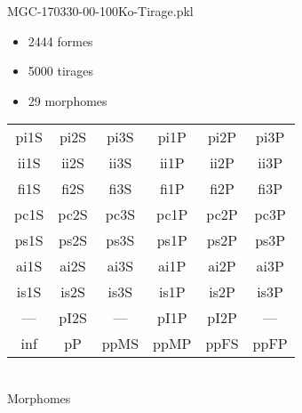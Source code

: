 MGC-170330-00-100Ko-Tirage.pkl
\begin{itemize}
\item 2444 formes
\item 5000 tirages
\item 29 morphomes
\end{itemize}
\begin{center}
\begin{tabular}{cccccc}
\hline
\cellcolor{white}pi1S & \cellcolor{orange}pi2S & \cellcolor{orange}pi3S & \cellcolor{blue}pi1P & \cellcolor{white}pi2P & \cellcolor{white}pi3P\\
\cellcolor{brown}ii1S & \cellcolor{brown}ii2S & \cellcolor{brown}ii3S & \cellcolor{white}ii1P & \cellcolor{white}ii2P & \cellcolor{brown}ii3P\\
\cellcolor{yellow}fi1S & \cellcolor{lime}fi2S & \cellcolor{lime}fi3S & \cellcolor{white}fi1P & \cellcolor{white}fi2P & \cellcolor{white}fi3P\\
\cellcolor{yellow}pc1S & \cellcolor{yellow}pc2S & \cellcolor{yellow}pc3S & \cellcolor{white}pc1P & \cellcolor{white}pc2P & \cellcolor{yellow}pc3P\\
\cellcolor{teal}ps1S & \cellcolor{teal}ps2S & \cellcolor{teal}ps3S & \cellcolor{white}ps1P & \cellcolor{white}ps2P & \cellcolor{teal}ps3P\\
\cellcolor{white}ai1S & \cellcolor{lightgray}ai2S & \cellcolor{lightgray}ai3S & \cellcolor{white}ai1P & \cellcolor{black}ai2P & \cellcolor{white}ai3P\\
\cellcolor{black}is1S & \cellcolor{black}is2S & \cellcolor{white}is3S & \cellcolor{black}is1P & \cellcolor{black}is2P & \cellcolor{black}is3P\\
--- & \cellcolor{white}pI2S & --- & \cellcolor{blue}pI1P & \cellcolor{white}pI2P & ---\\
\cellcolor{white}inf & \cellcolor{white}pP & \cellcolor{cyan}ppMS & \cellcolor{cyan}ppMP & \cellcolor{magenta}ppFS & \cellcolor{magenta}ppFP\\
\hline
\end{tabular}\\
Morphomes
\end{center}
\bigskip

